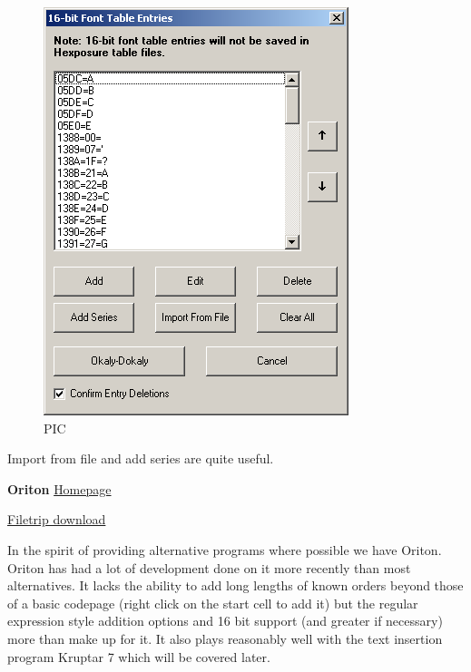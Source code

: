 \documentclass[
]{book}
\begin{document}
\begin{figure}
\centering
\includegraphics{images/99_home_fast6191_romhackingguide_unrenamed_file___al_borders_romhackingguidertexttablemaking2.png}
\caption{PIC}
\end{figure}

Import from file and add series are quite useful.

\textbf{Oriton} \href{http://www.magicteam.net/index.php?page=programs\&show=Oriton}{Homepage}

\href{http://filetrip.net/pc-downloads/applications/latest-oriton-f29376.html}{Filetrip download}

In the spirit of providing alternative programs where possible we have Oriton. Oriton has had a lot of development done on it more recently than most alternatives. It lacks the ability to add long lengths of known orders beyond those of a basic codepage (right click on the start cell to add it) but the regular expression style addition options and 16 bit support (and greater if necessary) more than make up for it. It also plays reasonably well with the text insertion program Kruptar 7 which will be covered later.
\end{document}
